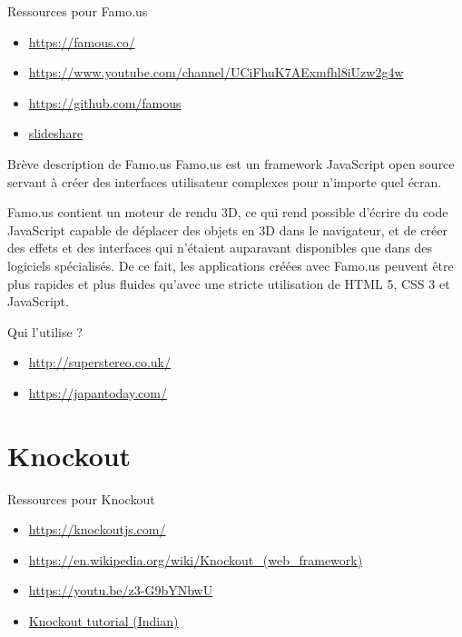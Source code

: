 \documentclass[presentation]{beamer}
\begin{document}
\begin{frame}[label={sec:org7fd73e9}]{Ressources pour Famo.us}
\begin{itemize}
\item \url{https://famous.co/}
\item \url{https://www.youtube.com/channel/UCiFhuK7AExmfhl8iUzw2g4w}
\item \url{https://github.com/famous}
\item \href{https://fr.slideshare.net/hinablue/famous-new-generation-of-html5-web-application-framework}{slideshare}
\end{itemize}
\end{frame}

\begin{frame}[label={sec:org587e4a5}]{Brève description de Famo.us}
Famo.us est un framework JavaScript open source servant à créer des
interfaces utilisateur complexes pour n'importe quel écran.

Famo.us contient un moteur de rendu 3D, ce qui rend possible
d'écrire du code JavaScript capable de déplacer des objets en 3D
dans le navigateur, et de créer des effets et des interfaces qui
n'étaient auparavant disponibles que dans des logiciels
spécialisés. De ce fait, les applications créées avec Famo.us
peuvent être plus rapides et plus fluides qu'avec une stricte
utilisation de HTML 5, CSS 3 et JavaScript.
\end{frame}

\begin{frame}[label={sec:org39ecba3}]{Qui l'utilise ?}
\begin{itemize}
\item \url{http://superstereo.co.uk/}
\item \url{https://japantoday.com/}
\end{itemize}
\end{frame}

\section{Knockout}
\label{sec:orga6f960f}

\begin{frame}[label={sec:org454b129}]{Ressources pour Knockout}
\begin{itemize}
\item \url{https://knockoutjs.com/}
\item \url{https://en.wikipedia.org/wiki/Knockout\_(web\_framework)}
\item \url{https://youtu.be/z3-G9bYNbwU}
\item \href{https://www.youtube.com/watch?v=yC9Lt6hTIUE\&list=PLo80fWiInSIONI-Al0iVvq9NNWllM0RrT}{Knockout tutorial (Indian)}
\end{itemize}
\end{frame}
\end{document}
